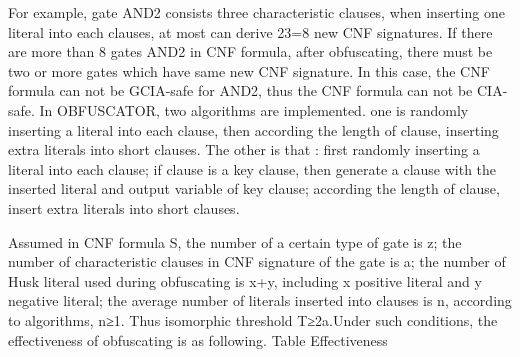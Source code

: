\documentclass[runningheads,a4paper]{llncs}
\begin{document}
For example, gate AND2 consists three characteristic clauses, when inserting one literal into each clauses, at most can derive 23=8 new CNF signatures. If there are more than 8 gates AND2 in CNF formula, after obfuscating, there must be two or more gates which have same new CNF signature. In this case, the CNF formula can not be GCIA-safe for AND2, thus the CNF formula can not be CIA-safe.
In OBFUSCATOR, two algorithms are implemented. one is randomly inserting a literal into each clause, then according the length of clause, inserting extra literals into short clauses. The other is that : first randomly inserting a literal into each clause; if clause is a key clause, then generate a clause with the inserted literal and output variable of key clause; according the length of clause, insert extra literals into short clauses.

Assumed in CNF formula S, the number of a certain type of gate is z; the number of characteristic clauses in CNF signature of the gate is a; the number of Husk literal used during obfuscating is x+y, including x positive literal and y negative literal; the average number of literals inserted into clauses is n, according to algorithms, n≥1. Thus isomorphic threshold T≥2a.Under such conditions, the effectiveness of obfuscating is as following. 
Table Effectiveness
\end{document}
